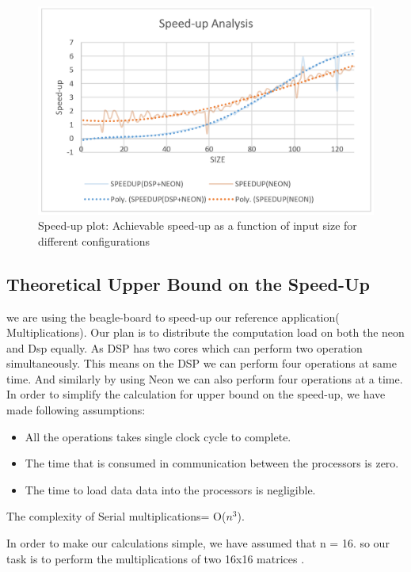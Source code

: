 \begin{figure}[h!]
\includegraphics[width=\textwidth]{analysis/speedup_plot}
\caption{Speed-up plot: Achievable speed-up as a function of input size for different configurations}
\label{fig:speedup_plot}
\end{figure}

\subsection{Theoretical Upper Bound on the Speed-Up}

we are using the beagle-board to speed-up our reference application( Multiplications). Our plan is to distribute the  computation load on both the neon and Dsp equally. As DSP has two cores which can perform two operation simultaneously. This means on the DSP we can perform four operations at same time. And similarly by using Neon we can also perform four operations at a time. 
In order to simplify the calculation for upper bound on the speed-up, we  have made following assumptions: 
\begin{itemize}
\item All the operations takes single clock cycle to complete.
\item The time that is consumed in communication between the processors is zero. 
\item The time to load data data into the processors is negligible. 
\end{itemize}

The complexity of Serial multiplications= O($n^3$).

In order to make our calculations simple, we have assumed  that n = 16. so our task is to perform the  multiplications of two 16x16 matrices . 

